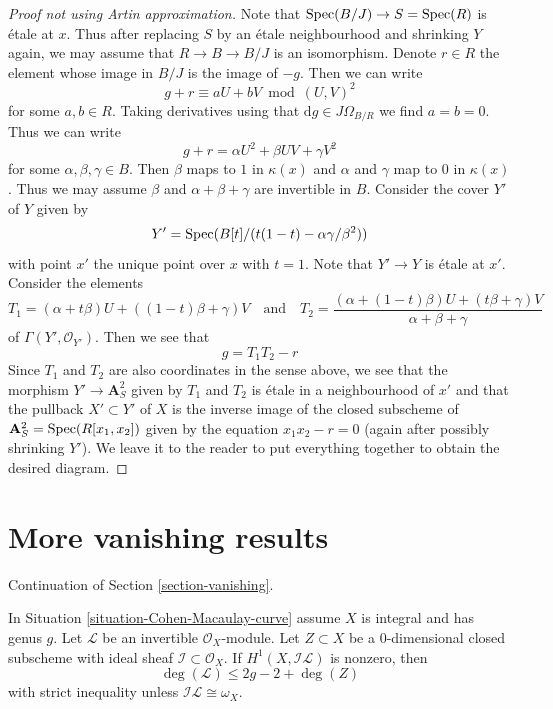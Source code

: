 \begin{proof}[Proof not using Artin approximation]
\medskip\noindent
Note that $\mathop{\mathrm{Spec}}(B/J) \to S = \mathop{\mathrm{Spec}}(R)$ is \'etale at $x$.
Thus after replacing $S$ by an \'etale neighbourhood and shrinking
$Y$ again, we may assume that $R \to B \to B/J$ is an isomorphism.
Denote $r \in R$ the element whose image in $B/J$ is the image of $-g$.
Then we can write
$$
g + r \equiv a U + b V \bmod (U, V)^2
$$
for some $a, b \in R$. Taking derivatives using that
$\text{d}g \in J\Omega_{B/R}$ we find $a = b = 0$.
Thus we can write
$$
g + r = \alpha U^2 + \beta UV + \gamma V^2
$$
for some $\alpha, \beta, \gamma \in B$. Then
$\beta$ maps to $1$ in $\kappa(x)$ and $\alpha$ and $\gamma$
map to $0$ in $\kappa(x)$.
Thus we may assume $\beta$ and $\alpha + \beta + \gamma$
are invertible in $B$. Consider the cover $Y'$ of $Y$ given by
$$
Y' = \mathop{\mathrm{Spec}}(B[t]/(t(1 - t) - \alpha \gamma / \beta^2))
$$
with point $x'$ the unique point over $x$ with $t = 1$.
Note that $Y' \to Y$ is \'etale at $x'$.
Consider the elements
$$
T_1 = (\alpha + t \beta)U + ((1 - t)\beta + \gamma)V
\quad\text{and}\quad
T_2 =
\frac{(\alpha + (1 - t) \beta)U + (t\beta + \gamma)V}{\alpha + \beta + \gamma}
$$
of $\Gamma(Y', \mathcal{O}_{Y'})$. Then we see that
$$
g = T_1 T_2 - r
$$
Since $T_1$ and $T_2$ are also coordinates in the sense above,
we see that the morphism $Y' \to \mathbf{A}^2_S$ given by $T_1$ and $T_2$
is \'etale in a neighbourhood of $x'$ and that the pullback
$X' \subset Y'$ of $X$ is the inverse image of the closed subscheme
of $\mathbf{A}^2_S = \mathop{\mathrm{Spec}}(R[x_1, x_2])$ given by the equation
$x_1x_2 - r = 0$ (again after possibly shrinking $Y'$).
We leave it to the reader to put everything together to
obtain the desired diagram.
\end{proof}




\section{More vanishing results}
\label{section-more-vanishing}

\noindent
Continuation of Section \ref{section-vanishing}.

\begin{lemma}
\label{lemma-h1-nonzero-degree-leq-2g-2}
In Situation \ref{situation-Cohen-Macaulay-curve} assume $X$ is integral and
has genus $g$. Let $\mathcal{L}$ be an invertible $\mathcal{O}_X$-module.
Let $Z \subset X$ be a $0$-dimensional closed subscheme with ideal
sheaf $\mathcal{I} \subset \mathcal{O}_X$. If $H^1(X, \mathcal{I}\mathcal{L})$
is nonzero, then
$$
\deg(\mathcal{L}) \leq 2g - 2 + \deg(Z)
$$
with strict inequality unless $\mathcal{I}\mathcal{L} \cong \omega_X$.
\end{lemma}

